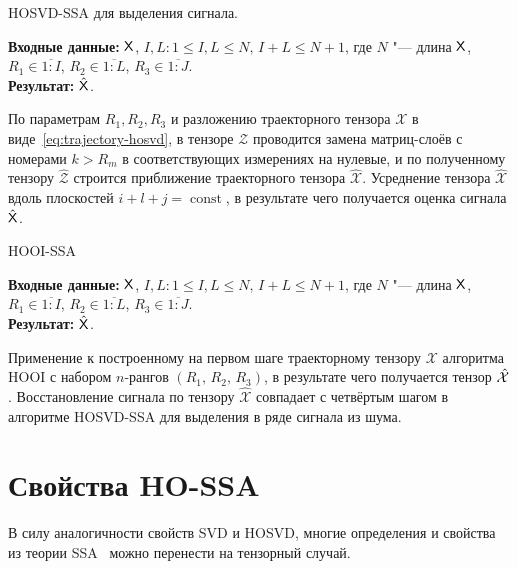 \documentclass[specialist,
    substylefile = spbu_report.rtx,
    subf,href,colorlinks=true, 12pt]{disser}
\theoremstyle{plain}
\theoremstyle{definition}
\theoremstyle{remark}
\newcommand{\Input}{\textbf{Входные данные: }}
\newcommand{\Output}{\textbf{Результат: }}
\begin{document}
    \begin{algorithm}[!ht]
        \caption{HOSVD-SSA для выделения сигнала.}
        \label{alg:hosvd-ssa-signal}
        \Input $\mathsf{X}$, $I,L: 1\leqslant I,L \leqslant N,\, I + L \leqslant N + 1$, где $N$ "--- длина $\mathsf{X}$, $R_1 \in \overline{1:I}$,
        $R_2 \in \overline{1:L}$, $R_3 \in \overline{1:J}$.\\
        \Output $\hat{\mathsf{X}}$.
        
        \begin{algorithmic}[1]
            \State По параметрам $R_1, R_2, R_3$ и разложению траекторного тензора $\mathcal{X}$
            в виде~\eqref{eq:trajectory-hosvd},
            в тензоре $\mathcal{Z}$ проводится замена матриц-слоёв с номерами $k>R_m$ в соответствующих измерениях
            на нулевые, и по полученному тензору $\hat{\mathcal{Z}}$
            строится приближение траекторного тензора $\hat{\mathcal{X}}$.
            \State Усреднение тензора $\hat{\mathcal{X}}$ вдоль плоскостей $i+l+j=\operatorname{const}$,
            в результате чего получается оценка сигнала $\hat{\mathsf{X}}$.
        \end{algorithmic}
    \end{algorithm}

    \begin{algorithm}[!ht]
        \caption{HOOI-SSA}
        \label{alg:hooi-ssa}
        \Input $\mathsf{X}$, $I,L: 1\leqslant I,L \leqslant N,\, I + L \leqslant N + 1$, где $N$ "--- длина $\mathsf{X}$, $R_1 \in \overline{1:I}$,
        $R_2 \in \overline{1:L}$, $R_3 \in \overline{1:J}$.\\
        \Output $\hat{\mathsf{X}}$.

        \begin{algorithmic}[1]
            \State Применение к построенному на первом шаге траекторному тензору $\mathcal{X}$ алгоритма
            HOOI с набором $n$-рангов $(R_1,\, R_2,\, R_3)$, в результате чего получается тензор $\hat{\mathcal{X}}$.
            \State Восстановление сигнала по тензору $\hat{\mathcal{X}}$ совпадает с четвёртым шагом в
            алгоритме HOSVD-SSA для выделения в ряде сигнала из шума.
        \end{algorithmic}
    \end{algorithm}


    \section{Свойства HO-SSA}\label{sec:HO-SSA-properties}
    В силу аналогичности свойств SVD и HOSVD, многие определения и свойства из теории SSA~\cite{ssa} можно перенести на тензорный случай.
\end{document}
